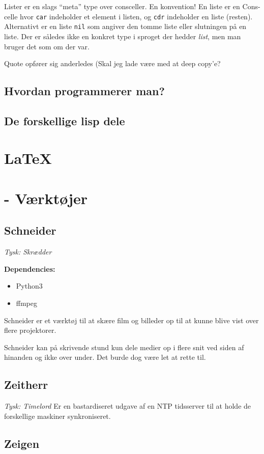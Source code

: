 \documentclass[10pt,a4paper,danish]{article}
\begin{document}
Lister er en slags ``meta'' type over consceller. En konvention!
En liste er en Cons-celle hvor \texttt{car} indeholder et element i listen, og
\texttt{cdr} indeholder en liste (resten).
Alternativt er en liste \texttt{nil} som angiver den tomme liste eller
slutningen på en liste.
Der er således ikke en konkret type i sproget der hedder \textit{list}, men man
bruger det som om der var.

Quote opfører sig anderledes
(Skal jeg lade være med at deep copy'e?

\subsection{Hvordan programmerer man?}
\subsection{De forskellige lisp dele}
\section{\LaTeX}
\section{- Værktøjer}
\subsection{Schneider}
\textit{Tysk: Skrædder}

\textbf{Dependencies:}
\begin{itemize}
\item Python3
\item ffmpeg
\end{itemize}

Schneider er et værktøj til at skære film og billeder op til at kunne blive vist over flere
projektorer.

Schneider kan på skrivende stund kun dele medier op i flere snit ved siden af
hinanden og ikke over under. Det burde dog være let at rette til.

\subsection{Zeitherr}
\textit{Tysk: Timelord}
Er en bastardiseret udgave af en NTP tidsserver til at holde de forskellige
maskiner synkroniseret.

\subsection{Zeigen}
\end{document}
